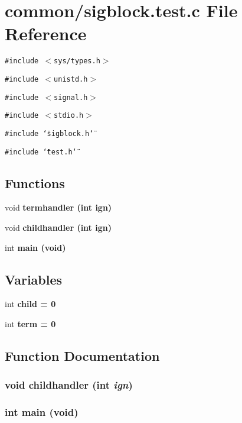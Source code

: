 \section{common/sigblock.test.c File Reference}
\label{sigblock_8test_8c}
{\tt \#include $<$sys/types.h$>$}\par
{\tt \#include $<$unistd.h$>$}\par
{\tt \#include $<$signal.h$>$}\par
{\tt \#include $<$stdio.h$>$}\par
{\tt \#include \char`\"{}sigblock.h\char`\"{}}\par
{\tt \#include \char`\"{}test.h\char`\"{}}\par
\subsection*{Functions}
\begin{CompactItemize}
\item 
void \bf{termhandler} (int ign)
\item 
void \bf{childhandler} (int ign)
\item 
int \bf{main} (void)
\end{CompactItemize}
\subsection*{Variables}
\begin{CompactItemize}
\item 
int \bf{child} = 0
\item 
int \bf{term} = 0
\end{CompactItemize}


\subsection{Function Documentation}
\subsubsection{\setlength{\rightskip}{0pt plus 5cm}void childhandler (int {\em ign})}\label{sigblock_8test_8c_79a516d759748ee3644687e4462bff7f}


\subsubsection{\setlength{\rightskip}{0pt plus 5cm}int main (void)}\label{sigblock_8test_8c_5ad1c26f00c2399d3a5c7850100212d0}


